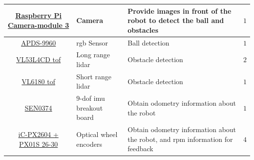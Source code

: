 \begin{table}[H]
\begin{tabularx}{\textwidth}{|c|X|X|c|}
		\href{https://www.electrokit.com/upload/product/41020/41020240/Camera_Module_3_Product_Brief.pdf}{Raspberry Pi Camera-module 3}                     & Camera                                                                                  & Provide images in front of the robot to detect the ball and obstacles               & $1$               \\ \hline
		\href{https://docs.broadcom.com/doc/AV02-4191EN}{APDS-9960}                                                                                         & \acs{rgb} Sensor                                                                        & Ball detection                                                                      & $1$               \\ \hline
		\href{https://learn.adafruit.com/adafruit-vl53l4cd-time-of-flight-distance-sensor?view=all}{VL53L4CD \acs{tof}}                                     & Long range \acs{lidar}                                                                  & Obstacle detection                                                                  & $2$               \\ \hline
		\href{https://www.electrokit.com/upload/product/41013/41013634/DM00112632.pdf}{VL6180 \acs{tof}}                                                    & Short range \acs{lidar}                                                                 & Obstacle detection                                                                  & $1$               \\ \hline
		\href{https://wiki.dfrobot.com/BNO055_Intelligent_9_Axis_Sensor_Module_SKU_SEN0374}{SEN0374}                                                        & $9$-\acs{dof} \acs{imu} breakout board                                                  & Obtain odometry information about the robot                                         & $1$               \\ \hline
		\href{https://www.ichaus.de/product/ic-px-series/\#documents}{iC-PX2604 + PX01S 26-30}                                                              & Optical wheel encoders                                                                  & Obtain odometry information about the robot, and \acs{rpm} information for feedback & $4$               \\ \hline
	\end{tabularx}
\end{table}


